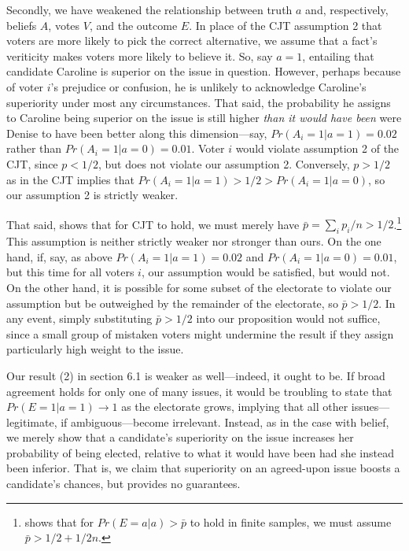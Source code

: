 \documentclass[11pt]{article}
\begin{document}
Secondly, we have weakened the relationship between truth $a$ and,
respectively, beliefs $A$, votes $V$, and the outcome $E$.
In place of the CJT assumption 2 that voters are more likely to pick
the correct alternative, we assume that a fact's veriticity
makes voters more likely to believe it.
So, say $a=1$, entailing that candidate Caroline is superior on the issue
in question.
However, perhaps because of voter $i$'s prejudice or confusion, he is
unlikely to acknowledge Caroline's superiority under most any circumstances.
That said, the probability he assigns to Caroline being superior on the issue is still higher \emph{than it would have been} were Denise to have been better along this dimension---say, $Pr(A_i=1|a=1)=0.02$ rather than $Pr(A_i=1|a=0)=0.01$.
Voter $i$ would violate assumption 2 of the CJT, since $p<1/2$, but
does not violate our assumption 2.
Conversely, $p>1/2$ as in the CJT implies that
$Pr(A_i=1|a=1)>1/2>Pr(A_i=1|a=0)$, so our assumption 2 is strictly
weaker.

That said, \citet{dietrich2008premises} shows that for CJT to
hold, we must merely have $\bar{p}=\sum_i
p_i/n>1/2$.\footnote{\citet{boland1989majority} shows that for
  $Pr(E=a|a)>\bar{p}$ to hold in finite samples, we must assume $\bar{p}>1/2 +1/2n$.}
This assumption is neither strictly weaker nor stronger than ours.
On the one hand, if, say, as above
$Pr(A_i=1|a=1)=0.02$ and $Pr(A_i=1|a=0)=0.01$, but this time for all
voters $i$, our assumption would be satisfied, but
\citet{dietrich2008premises} would not.
On the other hand, it is possible for some subset of the electorate to
violate our assumption but be outweighed by the remainder of the
electorate, so $\bar{p}>1/2$.
In any event, simply substituting $\bar{p}>1/2$ into our proposition
would not suffice, since a small group of mistaken voters might undermine the result if they assign particularly high weight to the issue. %

Our result (2) in section 6.1 is weaker as well---indeed, it ought to be.
If broad agreement holds for only one of many issues, it would be
troubling to state that $Pr(E=1|a=1)\rightarrow 1$ as the electorate
grows, implying that all other issues---legitimate, if
ambiguous---become irrelevant.
Instead, as in the case with belief, we merely show that a candidate's
superiority on the issue increases her probability of being elected,
relative to what it would have been had she instead been inferior.
That is, we claim that superiority on an agreed-upon issue boosts a
candidate's chances, but provides no guarantees.
\end{document}
